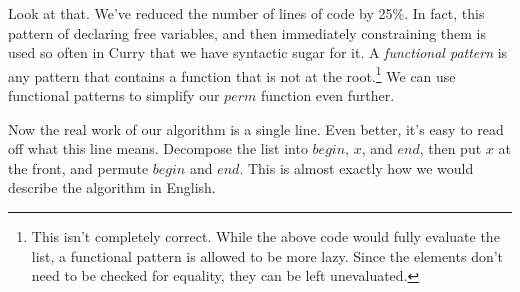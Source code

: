 \documentclass{book}
\theoremstyle{definition}
\newcommand{\Varid}[1]{\mathit{#1}}
\newcommand{\plus}{\mathbin{+\!\!\!+}}
\def\resethooks{%
  \global\let\SaveRestoreHook\empty
  \global\let\ColumnHook\empty}
\let\hspre\empty
\let\hspost\empty
\begin{document}
Look at that.
We've reduced the number of lines of code by 25\%.
In fact, this pattern of declaring free variables, and then immediately constraining them
is used so often in Curry that we have syntactic sugar for it.
A \textit{functional pattern} is any pattern that contains a function that is not at the
root.\footnote{
    This isn't completely correct.  While the above code would fully evaluate the list,
    a functional pattern is allowed to be more lazy.
    Since the elements don't need to be checked for equality, they can be left unevaluated.
}
We can use functional patterns to simplify our \ensuremath{\Varid{perm}} function even further.

\resethooks
Now the real work of our algorithm is a single line.
Even better, it's easy to read off what this line means.
Decompose the list into \ensuremath{\Varid{begin}}, \ensuremath{\Varid{x}}, and \ensuremath{\Varid{end}}, then put \ensuremath{\Varid{x}} at the front, and permute \ensuremath{\Varid{begin}} and \ensuremath{\Varid{end}}.
This is almost exactly how we would describe the algorithm in English.
\end{document}
